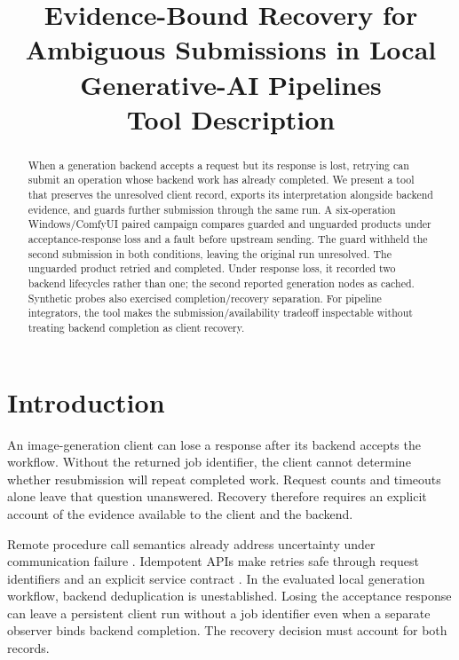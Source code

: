 \documentclass[conference,letterpaper,10pt]{IEEEtran}
\begin{document}
\title{Evidence-Bound Recovery for Ambiguous Submissions in Local Generative-AI Pipelines\\{\large Tool Description}}
\author{}
\maketitle
\begin{abstract}
When a generation backend accepts a request but its response is lost, retrying can submit an operation whose backend work has already completed. We present a tool that preserves the unresolved client record, exports its interpretation alongside backend evidence, and guards further submission through the same run. A six-operation Windows/ComfyUI paired campaign compares guarded and unguarded products under acceptance-response loss and a fault before upstream sending. The guard withheld the second submission in both conditions, leaving the original run unresolved. The unguarded product retried and completed. Under response loss, it recorded two backend lifecycles rather than one; the second reported generation nodes as cached. Synthetic probes also exercised completion/recovery separation. For pipeline integrators, the tool makes the submission/availability tradeoff inspectable without treating backend completion as client recovery.
\end{abstract}
\section{Introduction}

An image-generation client can lose a response after its backend accepts the
workflow. Without the returned job identifier, the client cannot determine
whether resubmission will repeat completed work. Request counts and timeouts
alone leave that question unanswered. Recovery therefore requires an explicit
account of the evidence available to the client and the backend.

Remote procedure call semantics already address uncertainty under communication
failure \cite{birrell1984}. Idempotent APIs make retries safe through request
identifiers and an explicit service contract \cite{aws}. In the evaluated local
generation workflow, backend deduplication is unestablished. Losing the acceptance
response can leave a persistent client run without a job identifier even when
a separate observer binds backend completion. The recovery decision must
account for both records.
\end{document}
